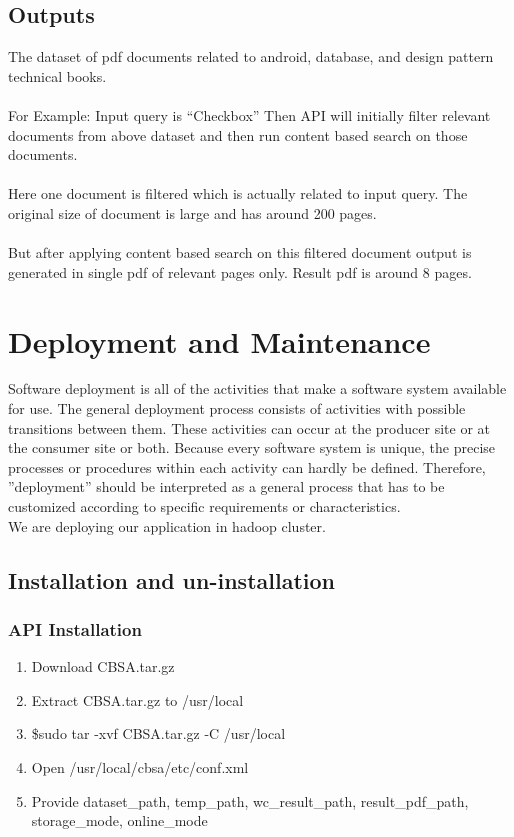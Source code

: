 \documentclass[oneside,a4paper,12pt]{report}
\begin{document}
{\section{Outputs}
The dataset of pdf documents related to android, database, and design pattern technical books.\\\\
For Example: Input query is “Checkbox”
Then API will initially filter relevant documents from above dataset and then run content based search on those documents.\\\\
Here one document is filtered which is actually related to input query. The original size of document is large and has around 200 pages. \\\\
But after applying content based search on this filtered document output is generated in single pdf of relevant pages only. Result pdf is around 8 pages.


\chapter{Deployment and Maintenance}

Software deployment is all of the activities that make a software system available for use. The general deployment process consists of activities with possible transitions between them. These activities can occur at the producer site or at the consumer site or both. Because every software system is unique, the precise processes or procedures within each activity can hardly be defined. Therefore, ”deployment” should be interpreted as a general process that has to be customized according to specific requirements or characteristics. \\
We are deploying our application in hadoop cluster.

\section{Installation and un-installation}
\subsection{API Installation}
	\begin{enumerate}
	\item Download CBSA.tar.gz 
	\item Extract CBSA.tar.gz to /usr/local
	\item \$sudo tar -xvf CBSA.tar.gz -C /usr/local
	\item Open /usr/local/cbsa/etc/conf.xml
	\item Provide dataset\_path,  temp\_path, wc\_result\_path,  result\_pdf\_path, storage\_mode, online\_mode
	\end{enumerate}
}
\end{document}
